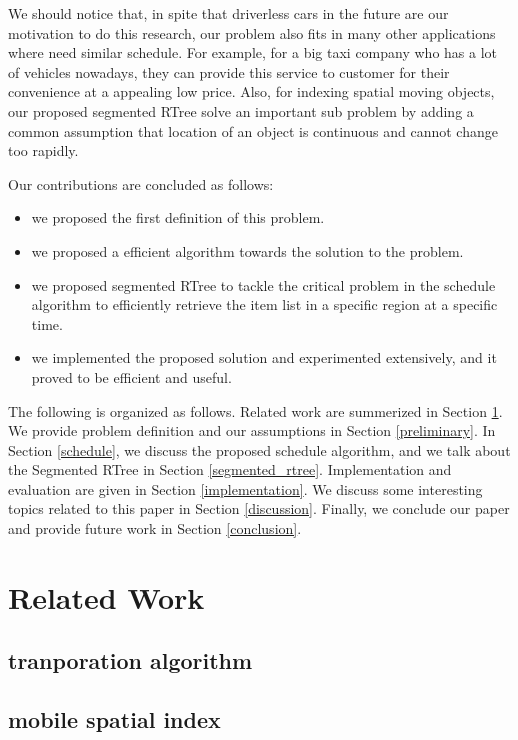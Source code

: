 \documentclass{vldb}
\begin{document}
We should notice that, in spite that driverless cars in the future are our motivation to do this research,
our problem also fits in many other applications where need similar schedule.
For example, for a big taxi company who has a lot of vehicles nowadays,
they can provide this service to customer for their convenience at a appealing low price.
Also, for indexing spatial moving objects,
our proposed segmented RTree solve an important sub problem
by adding a common assumption that location of an object is continuous and cannot change too rapidly.

Our contributions are concluded as follows:
\begin{itemize}
  \item we proposed the first definition of this problem.
  \item we proposed a efficient algorithm towards the solution to the problem.
  \item we proposed segmented RTree to tackle the critical problem in the schedule algorithm
  to efficiently retrieve the item list in a specific region at a specific time.
  \item we implemented the proposed solution and experimented extensively,
  and it proved to be efficient and useful.
\end{itemize}

The following is organized as follows.
Related work are summerized in Section \ref{related_work}.
We provide problem definition and our assumptions in Section \ref{preliminary}.
In Section \ref{schedule}, we discuss the proposed schedule algorithm,
and we talk about the Segmented RTree in Section \ref{segmented_rtree}.
Implementation and evaluation are given in Section \ref{implementation}.
We discuss some interesting topics related to this paper in Section \ref{discussion}.
Finally, we conclude our paper and provide future work in Section \ref{conclusion}.


\section{Related Work}
\label{related_work}
\subsection{tranporation algorithm}
\subsection{mobile spatial index}
\end{document}
